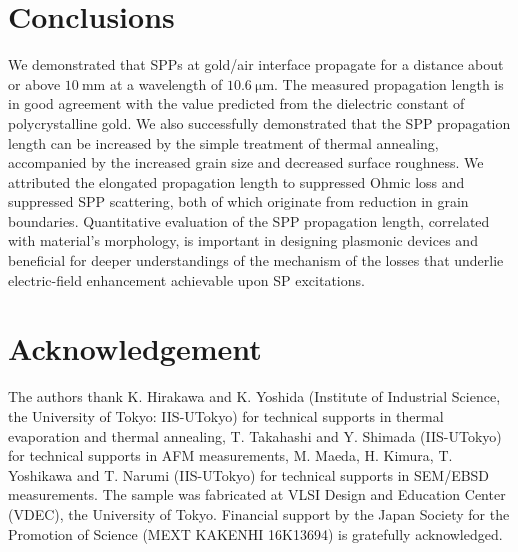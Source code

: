 \documentclass[aip,apl,reprint]{revtex4-1}
\begin{document}
\section{Conclusions}
\label{sec:conclusion}
We demonstrated that SPPs at gold/air interface propagate for a distance about or above $10\:\mathrm{mm}$ at a wavelength of $10.6\:\mathrm{\mu m}$. The measured propagation length is in good agreement with the value predicted from the dielectric constant of polycrystalline gold. We also successfully demonstrated that the SPP propagation length can be increased by the simple treatment of thermal annealing, accompanied by the increased grain size and decreased surface roughness. 
We attributed the elongated propagation length to suppressed Ohmic loss and suppressed SPP scattering, both of which originate from reduction in grain boundaries. 
Quantitative evaluation of the SPP propagation length, correlated with material's morphology, is important in designing plasmonic devices and beneficial for deeper understandings of the mechanism of the losses that underlie electric-field enhancement achievable upon SP excitations.


\section*{Acknowledgement}
The authors thank K. Hirakawa and K. Yoshida (Institute of Industrial Science, the University of Tokyo: IIS-UTokyo) for technical supports in thermal evaporation and thermal annealing, T. Takahashi and Y. Shimada (IIS-UTokyo) for technical supports in AFM measurements, M. Maeda, H. Kimura, T. Yoshikawa and T. Narumi (IIS-UTokyo) for technical supports in SEM/EBSD measurements.
The sample was fabricated at VLSI Design and Education Center (VDEC), the University of Tokyo. Financial support by the Japan Society for the Promotion of Science (MEXT KAKENHI 16K13694) is gratefully acknowledged.


\end{document}
